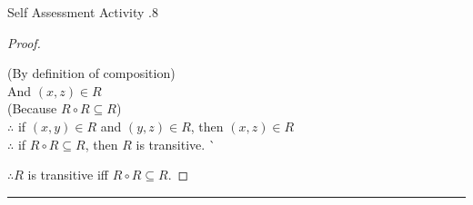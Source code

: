 \documentclass[../notes.tex]{subfiles}
\begin{document}
\begin{exercise}{Self Assessment Activity \thechapter.8}
\begin{enumerate}
\begin{proof}
\begin{enumerate}[label=(\roman*)]
\begin{subproof}[Subproof]
\begin{tabbing}
												\> (By definition of composition)\\
												And \> $(x, z) \in R$\\
												\> (Because $R \circ R \subseteq R$)\\
												$\therefore$ \> if $(x, y) \in R$ and $(y, z) \in R$, then $(x, z) \in R$\\
												$\therefore$ \> if $R \circ R \subseteq R$, then $R$ is transitive. \` \qedhere
											\end{tabbing}
										\end{subproof}
								\end{enumerate}
								$\therefore R$ is transitive iff $R \circ R \subseteq R$.
							\end{proof}
					\end{enumerate}
				\end{exercise}
	\noindent\rule{\textwidth}{0.4pt}
\end{document}
